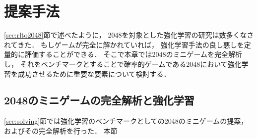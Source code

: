 \chapter{提案手法}
\label{chap:proposal}
\ref{sec:rlto2048}節で述べたように， 2048を対象とした強化学習の研究は数多くなされてきた．
もしゲームが完全に解かれていれば， 強化学習手法の良し悪しを定量的に評価することができる．
そこで本章では2048のミニゲームを完全解析し， それをベンチマークとすることで確率的ゲームである2048において強化学習を成功させるために重要な要素について検討する．



\section{2048のミニゲームの完全解析と強化学習}
\ref{sec:solving}節では強化学習のベンチマークとしての2048のミニゲームの提案， およびその完全解析を行った．
本節